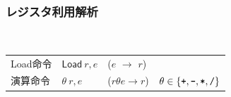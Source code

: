 \documentclass[ckj,dvipdfmx]{beamer}
\begin{document}
\begin{frame}[fragile]
  \frametitle{レジスタ利用解析}
  \\

  \vspace*{3mm}


  \vspace*{3mm}

  \begin{tabular}{llll}
  Load命令 & $\mathsf{Load}\ r,e$ & ($e$ $\rightarrow$ $r$)\\[5pt]
  演算命令 & $\theta\ r,e$ & ($r\theta e\rightarrow r$) & $\theta\in\{\texttt{+},\texttt{-},\texttt{*},\texttt{/}\}$
  \end{tabular}

  \vspace*{5mm}


\end{frame}
\end{document}
